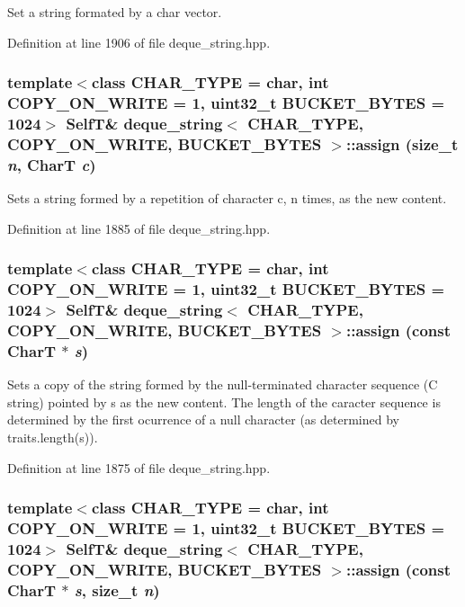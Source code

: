Set a string formated by a char vector. 

Definition at line 1906 of file deque\_\-string.hpp.\hypertarget{classdeque__string_131a536647ad8f6ad580addff43c6fc4}{
\subsubsection[{assign}]{\setlength{\rightskip}{0pt plus 5cm}template$<$class CHAR\_\-TYPE  = char, int COPY\_\-ON\_\-WRITE = 1, uint32\_\-t BUCKET\_\-BYTES = 1024$>$ {\bf SelfT}\& {\bf deque\_\-string}$<$ CHAR\_\-TYPE, COPY\_\-ON\_\-WRITE, BUCKET\_\-BYTES $>$::assign (size\_\-t {\em n}, \/  CharT {\em c})}}
\label{classdeque__string_131a536647ad8f6ad580addff43c6fc4}


Sets a string formed by a repetition of character c, n times, as the new content. 

Definition at line 1885 of file deque\_\-string.hpp.\hypertarget{classdeque__string_6011b5371797b1a7ce8e0f98de3892e2}{
\subsubsection[{assign}]{\setlength{\rightskip}{0pt plus 5cm}template$<$class CHAR\_\-TYPE  = char, int COPY\_\-ON\_\-WRITE = 1, uint32\_\-t BUCKET\_\-BYTES = 1024$>$ {\bf SelfT}\& {\bf deque\_\-string}$<$ CHAR\_\-TYPE, COPY\_\-ON\_\-WRITE, BUCKET\_\-BYTES $>$::assign (const CharT $\ast$ {\em s})}}
\label{classdeque__string_6011b5371797b1a7ce8e0f98de3892e2}


Sets a copy of the string formed by the null-terminated character sequence (C string) pointed by s as the new content. The length of the caracter sequence is determined by the first ocurrence of a null character (as determined by traits.length(s)). 

Definition at line 1875 of file deque\_\-string.hpp.\hypertarget{classdeque__string_df1494cee904a87cd5dd927b9bb2a3bf}{
\subsubsection[{assign}]{\setlength{\rightskip}{0pt plus 5cm}template$<$class CHAR\_\-TYPE  = char, int COPY\_\-ON\_\-WRITE = 1, uint32\_\-t BUCKET\_\-BYTES = 1024$>$ {\bf SelfT}\& {\bf deque\_\-string}$<$ CHAR\_\-TYPE, COPY\_\-ON\_\-WRITE, BUCKET\_\-BYTES $>$::assign (const CharT $\ast$ {\em s}, \/  size\_\-t {\em n})}}
\label{classdeque__string_df1494cee904a87cd5dd927b9bb2a3bf}


